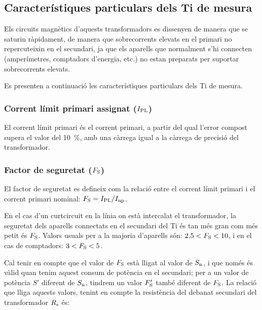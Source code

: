 \subsection{Característiques particulars dels Ti de mesura}

Els circuits magnètics d'aquests transformadors es dissenyen de
manera que se saturin ràpidament, de manera que
sobrecorrents elevats en el primari  no repercuteixin en el secundari,
ja que els aparells que normalment s'hi connecten (amperímetres,
comptadors d'energia, etc.) no estan preparats per suportar
sobrecorrents elevats.

Es presenten a continuació les característiques particulars dels Ti
de mesura.

\subsubsection{Corrent límit primari  assignat ($I_\mathrm{PL}$)}

El corrent  límit primari
és el corrent primari, a partir del qual l'error compost supera el valor del \SI{10}{\percent}, amb una càrrega igual a la càrrega de
precisió del transformador.

\subsubsection{Factor de seguretat ($F_\mathrm{S}$) }

 El factor de seguretat
es defineix com la relació entre el corrent límit primari
i el corrent primari nominal: $F_\mathrm{S} = I_\mathrm{PL} / I_\mathrm{np}$.

En el cas d'un curtcircuit en la línia on està intercalat el
transformador, la seguretat dels aparells connectats en el secundari
del Ti és tan més gran com més petit és  $F_\mathrm{S}$. Valors usuals
per a la majoria d'aparells són:  $\num{2,5}<F_\mathrm{S}<10$, i en el cas de comptadors: $3<F_\mathrm{S}<5$.

Cal tenir en compte que el valor de $F_\mathrm{S}$ està lligat
 al valor de $S_\mathrm{n}$, i que només és vàlid
quan tenim aquest consum de  potència en el secundari; per a un
valor de potència $S'$ diferent de $S_\mathrm{n}$, tindrem un valor
$F'_\mathrm{S}$ també diferent de  $F_\mathrm{S}$. La relació que
lliga aquests valors, tenint en compte la resistència del debanat
secundari del transformador  $R_\mathrm{s}$ és:

